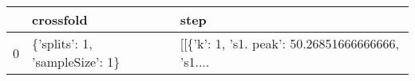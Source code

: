 \begin{tabular}{lll}
\toprule
{} &                       crossfold &                                               step \\
\midrule
0 &  \{'splits': 1, 'sampleSize': 1\} &  [[\{'k': 1, 's1. peak': 50.26851666666666, 's1.... \\
\bottomrule
\end{tabular}
